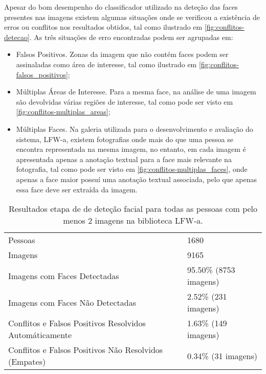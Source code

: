 Apesar do bom desempenho do classificador utilizado na deteção das faces presentes nas imagens existem algumas situações onde se verificou a existência de erros ou conflitos nos resultados obtidos, tal como ilustrado em \ref{fig:conflitos-detecao}. As três situações de erro encontradas podem ser agrupadas em:
\begin{itemize}
\item Falsos Positivos. Zonas da imagem que não contém faces podem ser assinaladas como área de interesse, tal como ilustrado em \ref{fig:conflitos-falsos_positivos};
\item Múltiplas Áreas de Interesse. Para a mesma face, na análise de uma imagem são devolvidas várias regiões de interesse, tal como pode ser visto em \ref{fig:conflitos-multiplas_areas};
\item Múltiplas Faces. Na galeria utilizada para o desenvolvimento e avaliação do sistema, LFW-a, existem fotografias onde mais do que uma pessoa se encontra representada na mesma imagem, no entanto, em cada imagem é apresentada apenas a anotação textual para a face mais relevante na fotografia, tal como pode ser visto em \ref{fig:conflitos-multiplas_faces}, onde apenas a face maior possuí uma anotação textual associada, pelo que apenas essa face deve ser extraída da imagem.
\end{itemize}

\begin{table}
\caption{Resultados etapa de de deteção facial para todas as pessoas com pelo menos 2 imagens na biblioteca LFW-a.}
    \begin{tabular}{ll}
    \hline
    \hline
    Pessoas                                                 & 1680                   \\
    Imagens                                                 & 9165                   \\ \hline
    Imagens com Faces Detectadas                            & 95.50\% (8753 imagens) \\
    Imagens com Faces Não Detectadas                        & 2.52\% (231 imagens)   \\
    Conflitos e Falsos Positivos Resolvidos Automáticamente & 1.63\% (149 imagens)   \\
    Conflitos e Falsos Positivos Não Resolvidos (Empates)   & 0.34\% (31 imagens)    \\
    \hline
    \hline
    \end{tabular}
    \label{tab:desempenho_detecao}
\end{table}

